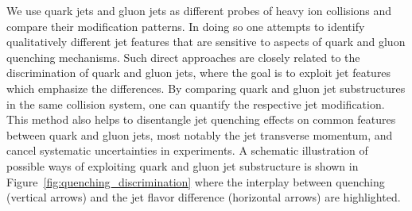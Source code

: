 \documentclass[notoc]{JHEP3}
\begin{document}
We use quark jets and gluon jets as different probes of heavy ion collisions and compare their modification patterns. In doing so one attempts to identify qualitatively different jet features that are sensitive to aspects of quark and gluon quenching mechanisms. Such direct approaches are closely related to the discrimination of quark and gluon jets, where the goal is to exploit jet features which emphasize the differences. By comparing quark and gluon jet substructures in the same collision system, one can quantify the respective jet modification. This method also helps to disentangle jet quenching effects on common features between quark and gluon jets, most notably the jet transverse momentum, and cancel systematic uncertainties in experiments. A schematic illustration of possible ways of exploiting quark and gluon jet substructure is shown in Figure~\ref{fig:quenching_discrimination} where the interplay between quenching (vertical arrows) and the jet flavor difference (horizontal arrows) are highlighted.

\end{document}
